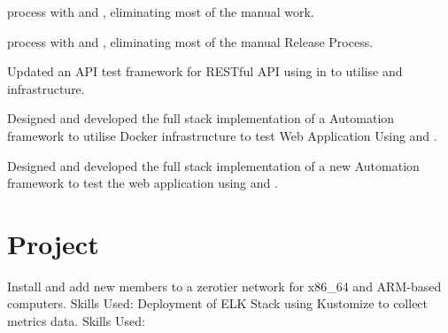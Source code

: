 \documentclass[]{resume}
\begin{document}
\begin{minipage}[t]{0.66\textwidth}
\begin{tightemize}
\item {} process with  and , eliminating most of the manual work.
\item {} process with  and , eliminating most of the manual Release Process.
\item Updated an API test framework for RESTful API using  in  to utilise  and  infrastructure.
\item Designed and developed the full stack implementation of a Automation framework to utilise Docker infrastructure to test Web Application Using  and .
\end{tightemize}
\sectionsep
{}
\begin{tightemize}
\item Designed and developed the full stack implementation of a new Automation framework to test the web application using  and .
\end{tightemize}
\sectionsep


\section{Project}
Install and add new members to a zerotier network for x86\_64 and ARM-based computers.
\newline
Skills Used: 
\sectionsep
{}
Deployment of ELK Stack using Kustomize to collect metrics data.
\newline
Skills Used: 
\sectionsep



\end{minipage} 
\end{document}
